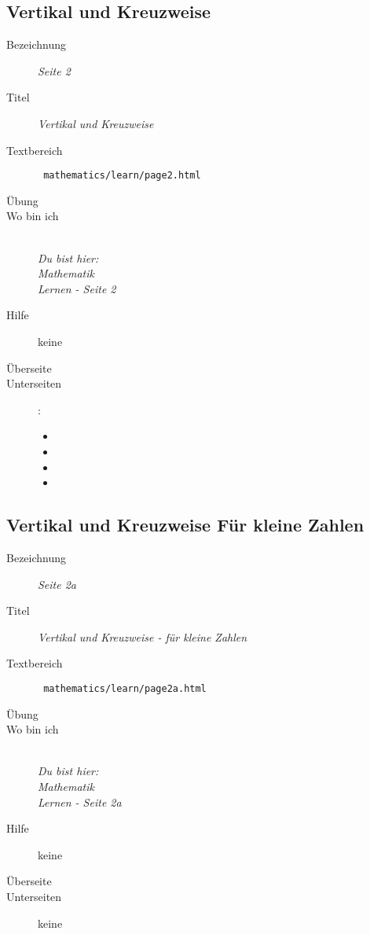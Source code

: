 \subsection{ Vertikal und Kreuzweise }
\label{cha:math-learn-page2}
\begin{description}
  \item[Bezeichnung] \emph{ Seite 2 }
  \item[Titel] \emph{ Vertikal und Kreuzweise }
  \item[Textbereich] \texttt{ mathematics/learn/page2.html }
  \item[Übung] 
  \item[Wo bin ich] \emph{\\Du bist hier:\\Mathematik\\Lernen - Seite 2 }
  \item[Hilfe] keine
  \item[Überseite] 
  \item[Unterseiten] :
  \begin{itemize}
    \item {}
    \item {}
    \item {}
    \item {}
  \end{itemize}
\end{description}


\subsection{ Vertikal und Kreuzweise Für kleine Zahlen }
\label{cha:math-learn-page2a}
\begin{description}
  \item[Bezeichnung] \emph{ Seite 2a }
  \item[Titel] \emph{ Vertikal und Kreuzweise - für kleine Zahlen }
  \item[Textbereich] \texttt{ mathematics/learn/page2a.html }
  \item[Übung] 
  \item[Wo bin ich] \emph{\\Du bist hier:\\Mathematik\\Lernen - Seite 2a }
  \item[Hilfe] keine
  \item[Überseite] 
  \item[Unterseiten] keine
\end{description}


